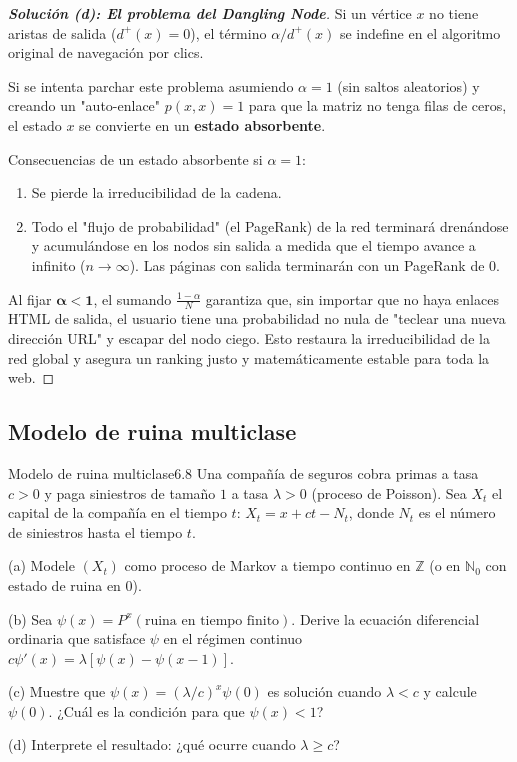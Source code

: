 \documentclass[10pt,a4paper]{article}
\begin{document}
\begin{proof}[\textbf{Solución (d): El problema del Dangling Node}]
    Si un vértice $x$ no tiene aristas de salida ($d^+(x) = 0$), el término $\alpha / d^+(x)$ se indefine en el algoritmo original de navegación por clics. 
    
    Si se intenta parchar este problema asumiendo $\alpha = 1$ (sin saltos aleatorios) y creando un "auto-enlace" $p(x,x) = 1$ para que la matriz no tenga filas de ceros, el estado $x$ se convierte en un \textbf{estado absorbente}. 
    
    Consecuencias de un estado absorbente si $\alpha = 1$:
    \begin{enumerate}
        \item Se pierde la irreducibilidad de la cadena.
        \item Todo el "flujo de probabilidad" (el PageRank) de la red terminará drenándose y acumulándose en los nodos sin salida a medida que el tiempo avance a infinito ($n \to \infty$). Las páginas con salida terminarán con un PageRank de 0.
    \end{enumerate}
    
    Al fijar $\mathbf{\alpha < 1}$, el sumando $\frac{1-\alpha}{N}$ garantiza que, sin importar que no haya enlaces HTML de salida, el usuario tiene una probabilidad no nula de "teclear una nueva dirección URL" y escapar del nodo ciego. Esto restaura la irreducibilidad de la red global y asegura un ranking justo y matemáticamente estable para toda la web.
\end{proof}


\newpage

\subsection{Modelo de ruina multiclase}



\begin{ejercicio}{Modelo de ruina multiclase}{6.8}
    Una compañía de seguros cobra primas a tasa $c > 0$ y paga siniestros de tamaño $1$ a tasa $\lambda > 0$ (proceso de Poisson). Sea $X_t$ el capital de la compañía en el tiempo $t$: $X_t = x + ct - N_t$, donde $N_t$ es el número de siniestros hasta el tiempo $t$.
    
    (a) Modele $(X_t)$ como proceso de Markov a tiempo continuo en $\mathbb{Z}$ (o en $\mathbb{N}_0$ con estado de ruina en 0).
    
    (b) Sea $\psi(x) = P^x(\text{ruina en tiempo finito})$. Derive la ecuación diferencial ordinaria que satisface $\psi$ en el régimen continuo $c \psi'(x) = \lambda[\psi(x) - \psi(x - 1)]$.
    
    (c) Muestre que $\psi(x) = (\lambda/c)^x \psi(0)$ es solución cuando $\lambda < c$ y calcule $\psi(0)$. ¿Cuál es la condición para que $\psi(x) < 1$?
    
    (d) Interprete el resultado: ¿qué ocurre cuando $\lambda \ge c$?
\end{ejercicio}
\end{document}
